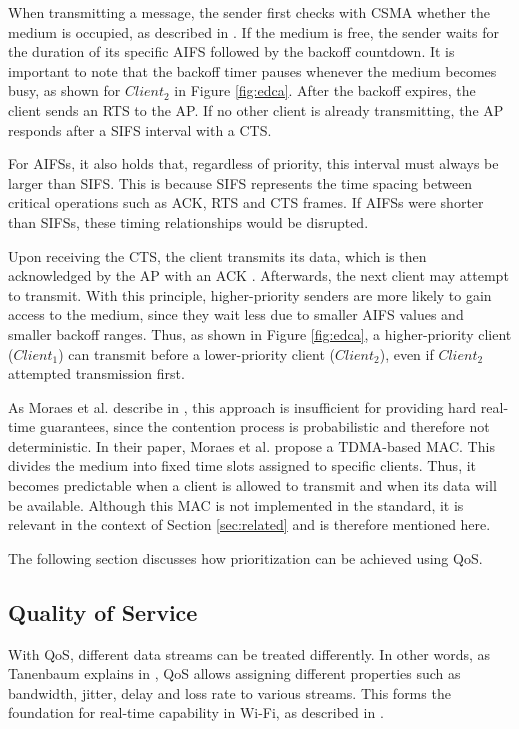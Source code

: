 When transmitting a message, the sender first checks with \ac{CSMA} whether the medium is occupied, as described in \cite[p. 6]{csma_edca}.  
If the medium is free, the sender waits for the duration of its specific \ac{AIFS} followed by the backoff countdown.  
It is important to note that the backoff timer pauses whenever the medium becomes busy, as shown for $Client_2$ in Figure \ref{fig:edca}.  
After the backoff expires, the client sends an \ac{RTS} to the \ac{AP}.  
If no other client is already transmitting, the \ac{AP} responds after a \ac{SIFS} interval with a \ac{CTS}.  

For \acp{AIFS}, it also holds that, regardless of priority, this interval must always be larger than \ac{SIFS}.  
This is because \ac{SIFS} represents the time spacing between critical operations such as ACK, \ac{RTS} and \ac{CTS} frames.  
If \acp{AIFS} were shorter than \acp{SIFS}, these timing relationships would be disrupted.  

Upon receiving the \ac{CTS}, the client transmits its data, which is then acknowledged by the \ac{AP} with an ACK \cite[p. 7]{csma_edca}.  
Afterwards, the next client may attempt to transmit.  
With this principle, higher-priority senders are more likely to gain access to the medium, since they wait less due to smaller \ac{AIFS} values and smaller backoff ranges.  
Thus, as shown in Figure \ref{fig:edca}, a higher-priority client ($Client_1$) can transmit before a lower-priority client ($Client_2$), even if $Client_2$ attempted transmission first.  

As Moraes et al. describe in \cite{4638758}, this approach is insufficient for providing hard real-time guarantees, since the contention process is probabilistic and therefore not deterministic.  
In their paper, Moraes et al. propose a \ac{TDMA}-based \ac{MAC}.  
This divides the medium into fixed time slots assigned to specific clients.  
Thus, it becomes predictable when a client is allowed to transmit and when its data will be available.  
Although this \ac{MAC} is not implemented in the standard, it is relevant in the context of Section \ref{sec:related} and is therefore mentioned here.  

The following section discusses how prioritization can be achieved using \ac{QoS}.  

\subsection{Quality of Service} \label{subsec:qos}
With \ac{QoS}, different data streams can be treated differently.  
In other words, as Tanenbaum explains in \cite[p. 405]{andrew_net}, \ac{QoS} allows assigning different properties such as bandwidth, jitter, delay and loss rate to various streams.  
This forms the foundation for real-time capability in Wi-Fi, as described in \cite[p. 2]{rfc1633}.  

